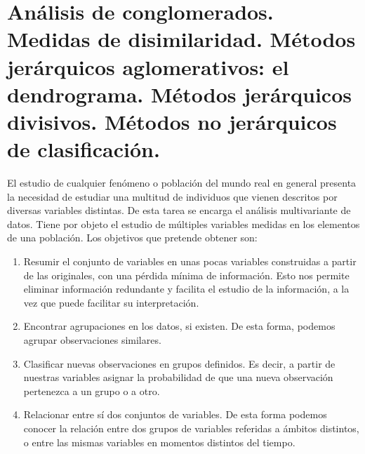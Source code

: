 \chapter[An\'alisis de conglomerados.]{An\'alisis de conglomerados. \\
\normalsize  Medidas de disimilaridad. M\'etodos jer\'arquicos aglomerativos: el dendrograma. M\'etodos jer\'arquicos divisivos. M\'etodos no jer\'arquicos de clasificaci\'on.}


El estudio de cualquier fen\'omeno o poblaci\'on del mundo real en general presenta la necesidad de estudiar una multitud de individuos que vienen descritos por diversas variables distintas. De esta tarea se encarga el an\'alisis multivariante de datos. Tiene por objeto el estudio de m\'ultiples variables medidas en los elementos de una poblaci\'on. Los objetivos que pretende obtener son:
\begin{enumerate}
\item Resumir el conjunto de variables en unas pocas variables construidas a partir de las originales, con una p\'erdida m\'inima de informaci\'on. Esto nos permite eliminar informaci\'on redundante y facilita el estudio de la informaci\'on, a la vez que puede facilitar su interpretaci\'on.
\item Encontrar agrupaciones en los datos, si existen. De esta forma, podemos agrupar observaciones similares.
\item Clasificar nuevas observaciones en grupos definidos. Es decir, a partir de nuestras variables asignar la probabilidad de que una nueva observaci\'on pertenezca a un grupo o a otro.
\item Relacionar entre s\'i dos conjuntos de variables. De esta forma podemos conocer la relaci\'on entre dos grupos de variables referidas a \'ambitos distintos, o entre las mismas variables en momentos distintos del tiempo.
\end{enumerate}

